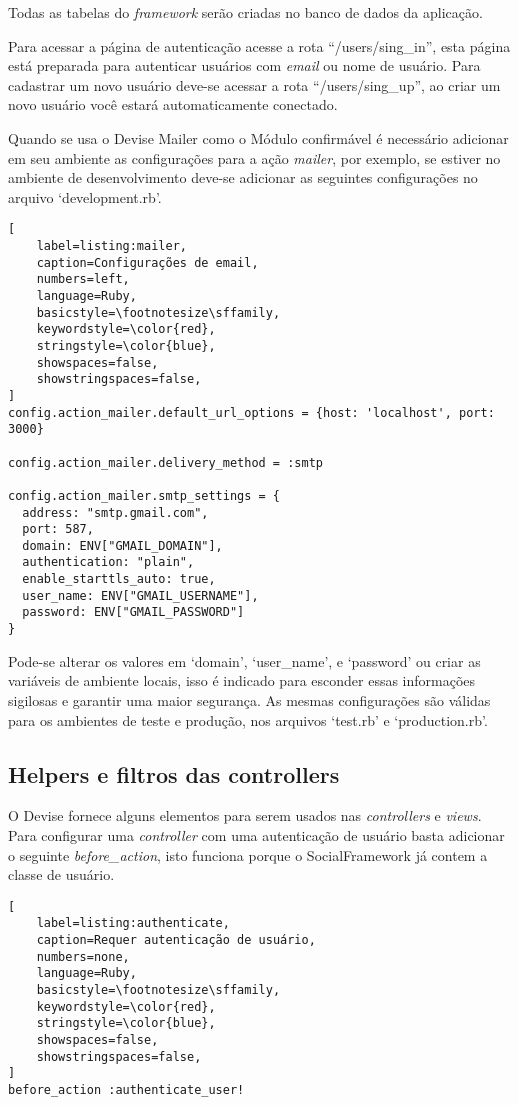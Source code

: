 Todas as tabelas do \textit{framework} serão criadas no banco de dados da aplicação.

Para acessar a página de autenticação acesse a rota ``/users/sing\_in'', esta página está preparada para autenticar usuários com \textit{email} ou nome de usuário. Para cadastrar um novo usuário deve-se acessar a rota ``/users/sing\_up'', ao criar um novo usuário você estará automaticamente conectado.

Quando se usa o Devise Mailer como o Módulo confirmável é necessário adicionar em seu ambiente as configurações para a ação \textit{mailer}, por exemplo, se estiver no ambiente de desenvolvimento deve-se adicionar as seguintes configurações no arquivo `development.rb'.

\begin{lstlisting}[
    label=listing:mailer,
    caption=Configurações de email,
    numbers=left,
    language=Ruby,
    basicstyle=\footnotesize\sffamily,
    keywordstyle=\color{red},
    stringstyle=\color{blue},
    showspaces=false,
    showstringspaces=false,
]
config.action_mailer.default_url_options = {host: 'localhost', port: 3000}

config.action_mailer.delivery_method = :smtp

config.action_mailer.smtp_settings = {
  address: "smtp.gmail.com",
  port: 587,
  domain: ENV["GMAIL_DOMAIN"],
  authentication: "plain",
  enable_starttls_auto: true,
  user_name: ENV["GMAIL_USERNAME"],
  password: ENV["GMAIL_PASSWORD"]
}
\end{lstlisting}

Pode-se alterar os valores em `domain', `user\_name', e `password' ou criar as variáveis de ambiente locais, isso é indicado para esconder essas informações sigilosas e garantir uma maior segurança. As mesmas configurações são válidas para os ambientes de teste e produção, nos arquivos `test.rb' e `production.rb'.

\subsection{Helpers e filtros das controllers}

O Devise fornece alguns elementos para serem usados nas \textit{controllers} e \textit{views}. Para configurar uma \textit{controller} com uma autenticação de usuário basta adicionar o seguinte \textit{before\_action}, isto funciona porque o SocialFramework já contem a classe de usuário.

\begin{lstlisting}[
    label=listing:authenticate,
    caption=Requer autenticação de usuário,
    numbers=none,
    language=Ruby,
    basicstyle=\footnotesize\sffamily,
    keywordstyle=\color{red},
    stringstyle=\color{blue},
    showspaces=false,
    showstringspaces=false,
]
before_action :authenticate_user!
\end{lstlisting}

